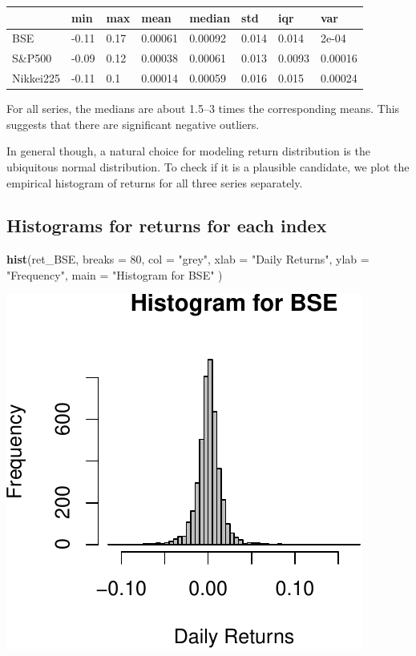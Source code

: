 \documentclass[11pt,]{article}
\newenvironment{Shaded}{\begin{snugshade}}{\end{snugshade}}
\newcommand{\KeywordTok}[1]{\textcolor[rgb]{0.13,0.29,0.53}{\textbf{#1}}}
\newcommand{\DataTypeTok}[1]{\textcolor[rgb]{0.13,0.29,0.53}{#1}}
\newcommand{\DecValTok}[1]{\textcolor[rgb]{0.00,0.00,0.81}{#1}}
\newcommand{\StringTok}[1]{\textcolor[rgb]{0.31,0.60,0.02}{#1}}
\newcommand{\NormalTok}[1]{#1}
\begin{document}
\begin{longtable}[]{@{}llllllll@{}}
\toprule
& min & max & mean & median & std & iqr & var\tabularnewline
\midrule
\endhead
BSE & -0.11 & 0.17 & 0.00061 & 0.00092 & 0.014 & 0.014 &
2e-04\tabularnewline
S\&P500 & -0.09 & 0.12 & 0.00038 & 0.00061 & 0.013 & 0.0093 &
0.00016\tabularnewline
Nikkei225 & -0.11 & 0.1 & 0.00014 & 0.00059 & 0.016 & 0.015 &
0.00024\tabularnewline
\bottomrule
\end{longtable}

For all series, the medians are about 1.5--3 times the corresponding
means. This suggests that there are significant negative outliers.

In general though, a natural choice for modeling return distribution is
the ubiquitous normal distribution. To check if it is a plausible
candidate, we plot the empirical histogram of returns for all three
series separately.

\subsection{Histograms for returns for each
index}\label{histograms-for-returns-for-each-index}

\begin{Shaded}
\begin{Highlighting}[]
\KeywordTok{hist}\NormalTok{(ret_BSE,}
     \DataTypeTok{breaks =} \DecValTok{80}\NormalTok{,}
     \DataTypeTok{col =} \StringTok{"grey"}\NormalTok{,}
     \DataTypeTok{xlab =} \StringTok{"Daily Returns"}\NormalTok{,}
     \DataTypeTok{ylab =} \StringTok{"Frequency"}\NormalTok{,}
     \DataTypeTok{main =} \StringTok{"Histogram for BSE"}
\NormalTok{     )}
\end{Highlighting}
\end{Shaded}

\begin{center}\includegraphics{FMC_T4_PhD_Fin_Time_Series_files/figure-latex/histograms-1} \end{center}
\end{document}
